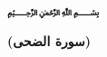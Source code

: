 \thispagestyle{empty}
\begin{huge}
	\begin{center}
		\bfseries
		﷽\\
		\vspace{15pt}
		\quranayah[93][5]
	\end{center}
	\vspace{10pt}
	\begin{flushleft}
		\textbf{(سورة الضحى)}
	\end{flushleft}
\end{huge}









